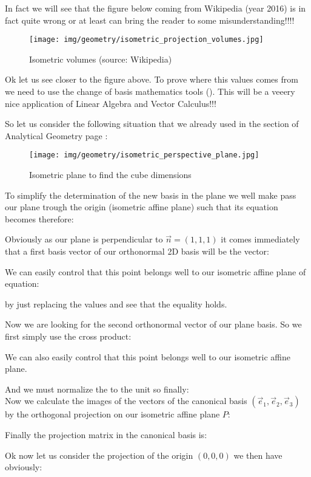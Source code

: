 	In fact we will see that the figure below coming from Wikipedia (year 2016) is in fact quite wrong or at least can bring the reader to some misunderstanding!!!!
	
	\begin{figure}[H]
		\centering
		\texttt{[image: img/geometry/isometric\_projection\_volumes.jpg]}
		\caption[Isometric volumes]{Isometric volumes (source: Wikipedia)}
	\end{figure}
	Ok let us see closer to the figure above. To prove where this values comes from we need to use the change of basis mathematics tools (). This will be a veeery nice application of Linear Algebra and Vector Calculus!!!
	
	So let us consider the following situation that we already used in the section of Analytical Geometry page \pageref{isometric plane}:
	\begin{figure}[H]
		\centering
		\texttt{[image: img/geometry/isometric\_perspective\_plane.jpg]}
		\caption{Isometric plane to find the cube dimensions}
	\end{figure}	
	To simplify the determination of the new basis in the plane we well make pass our plane trough the origin (isometric affine plane) such that its equation becomes therefore:
	

	Obviously as our plane is perpendicular to $\vec{n}=(1,1,1)$ it comes immediately that a first basis vector of our orthonormal 2D basis will be the vector:
	
	We can easily control that this point belongs well to our isometric affine plane of equation:
	
	by just replacing the values and see that the equality holds.

		Now we are looking for the second orthonormal vector of our plane basis. So we first simply use the cross product:
	
	We can also easily control that this point belongs well to our isometric affine plane.
	
	And we must normalize the to the unit so finally:\\
	
	Now we calculate the images of the vectors of the canonical basis $(\vec{e}_1,\vec{e}_2,\vec{e}_3)$ by the orthogonal projection on our isometric affine plane $P$:
	
	Finally the projection matrix in the canonical basis is:
	
	Ok now let us consider the projection of the origin $(0,0,0)$ we then have obviously:
	
